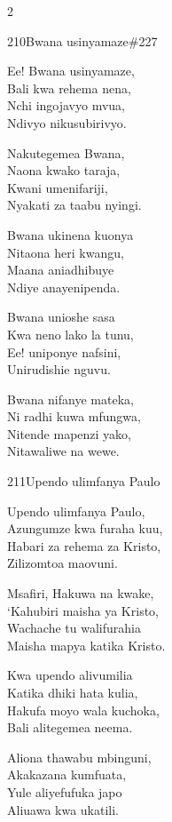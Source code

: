 \documentclass{article}
\begin{document}
\begin{multicols}{2}
\begin{hymn}{210}{Bwana usinyamaze}{\#227}
\begin{stanza}
Ee! Bwana usinyamaze,\\
Bali kwa rehema nena,\\
Nchi ingojavyo mvua,\\
Ndivyo nikusubirivyo.
\end{stanza}
\begin{chorus}
Nakutegemea Bwana,\\
Naona kwako taraja,\\
Kwani umenifariji,\\
Nyakati za taabu nyingi.
\end{chorus}
\begin{stanza}
Bwana ukinena kuonya\\
Nitaona heri kwangu,\\
Maana aniadhibuye\\
Ndiye anayenipenda.
\end{stanza}
\begin{stanza}
Bwana unioshe sasa\\
Kwa neno lako la tunu,\\
Ee! uniponye nafsini,\\
Unirudishie nguvu.
\end{stanza}
\begin{stanza}
Bwana nifanye mateka,\\
Ni radhi kuwa mfungwa,\\
Nitende mapenzi yako,\\
Nitawaliwe na wewe.
\end{stanza}
\end{hymn}

\begin{hymn}{211}{Upendo ulimfanya Paulo}{}
\begin{stanza}
Upendo ulimfanya Paulo,\\
Azungumze kwa furaha kuu,\\
Habari za rehema za Kristo,\\
Zilizomtoa maovuni.
\end{stanza}
\begin{stanza}
Msafiri, Hakuwa na kwake,\\
`Kahubiri maisha ya Kristo,\\
Wachache tu walifurahia\\
Maisha mapya katika Kristo.
\end{stanza}
\begin{stanza}
Kwa upendo alivumilia\\
Katika dhiki hata kulia,\\
Hakufa moyo wala kuchoka,\\
Bali alitegemea neema.
\end{stanza}
\begin{stanza}
Aliona thawabu mbinguni,\\
Akakazana kumfuata,\\
Yule aliyefufuka japo\\
Aliuawa kwa ukatili.
\end{stanza}
\end{hymn}


\end{multicols}
\end{document}
